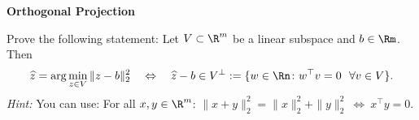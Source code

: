 \textbf{\normalsize Orthogonal Projection}

Prove the following statement: Let $V \subset \R^m$ be a linear subspace and $b \in \Rm$. Then 
		$$\widehat{z}= \arg\min_{z\in V} \|z-b\|_2^2 ~~~\Leftrightarrow~~~ \widehat{z}-b \in V^\bot := \{w\in \Rn\colon w^\top v = 0 ~~ \forall v\in V\}.  $$
\textit{Hint:} You can use: For all $x,y\in \R^m$: $\|x+y\|_2^2 = \|x\|_2^2 + \|y\|_2^2~\Leftrightarrow~x^\top y = 0$.